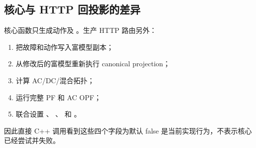 \subsection{核心与 HTTP 回投影的差异}

核心函数只生成动作及 。生产 HTTP 路由另外：
\begin{enumerate}
  \item 把故障和动作写入富模型副本；
  \item 从修改后的富模型重新执行 canonical projection；
  \item 计算 AC/DC/混合拓扑；
  \item 运行完整 PF 和 AC OPF；
  \item 联合设置 、
        、 和
        。
\end{enumerate}
因此直接 C++ 调用看到这些四个字段为默认 false 是当前实现行为，不表示核心已经尝试并失败。
